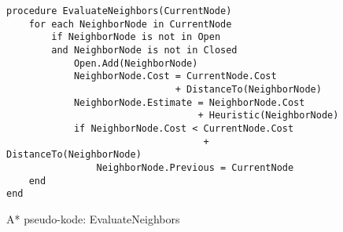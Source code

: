 \begin{figure}[H]
\begin{lstlisting}
procedure EvaluateNeighbors(CurrentNode)
	for each NeighborNode in CurrentNode
    	if NeighborNode is not in Open
    	and NeighborNode is not in Closed
    		Open.Add(NeighborNode)
    		NeighborNode.Cost = CurrentNode.Cost 
    						  + DistanceTo(NeighborNode)
		    NeighborNode.Estimate = NeighborNode.Cost
		    					  + Heuristic(NeighborNode)
			if NeighborNode.Cost < CurrentNode.Cost
								   + DistanceTo(NeighborNode)
				NeighborNode.Previous = CurrentNode
	end
end
\end{lstlisting}
\caption{A* pseudo-kode: EvaluateNeighbors}\label{AStarCodeEvaluateNeighbors}
\end{figure}